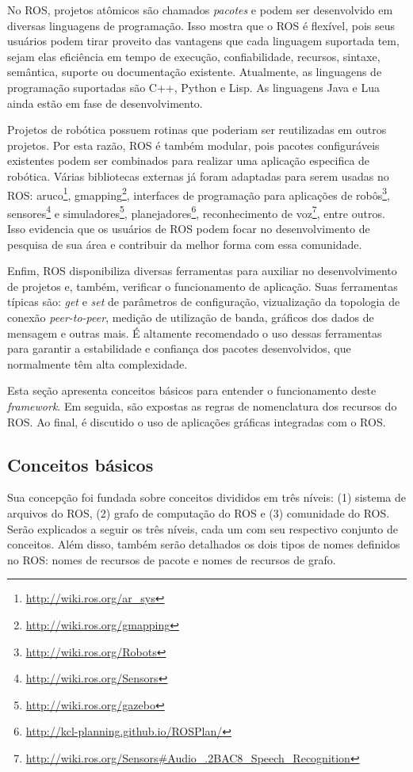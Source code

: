         No ROS, projetos atômicos são chamados \textit{pacotes} e podem ser desenvolvido em diversas linguagens de programação. Isso mostra que o ROS é flexível, pois seus usuários podem tirar proveito das vantagens que cada linguagem suportada tem, sejam elas eficiência em tempo de execução, confiabilidade, recursos, sintaxe, semântica, suporte ou documentação existente. Atualmente, as linguagens de programação suportadas são C++, Python e Lisp. As linguagens Java e Lua ainda estão em fase de desenvolvimento.
        
        Projetos de robótica possuem rotinas que poderiam ser reutilizadas em outros projetos. Por esta razão, ROS é também modular, pois pacotes configuráveis existentes podem ser combinados para realizar uma aplicação especifica de robótica. Várias bibliotecas externas já foram adaptadas para serem usadas no ROS: aruco\footnote{\url{http://wiki.ros.org/ar_sys}}, gmapping\footnote{\url{http://wiki.ros.org/gmapping}}, interfaces de programação para aplicações de robôs\footnote{\url{http://wiki.ros.org/Robots}}, sensores\footnote{\url{http://wiki.ros.org/Sensors}} e simuladores\footnote{\url{http://wiki.ros.org/gazebo}}, planejadores\footnote{\url{http://kcl-planning.github.io/ROSPlan/}}, reconhecimento de voz\footnote{\url{http://wiki.ros.org/Sensors\#Audio_.2BAC8_Speech_Recognition}}, entre outros. Isso evidencia que os usuários de ROS podem focar no desenvolvimento de pesquisa de sua área e contribuir da melhor forma com essa comunidade.
        
        Enfim, ROS disponibiliza diversas ferramentas para auxiliar no desenvolvimento de projetos e, também, verificar o funcionamento de aplicação. Suas ferramentas típicas são: \textit{get} e \textit{set} de parâmetros de configuração, vizualização da topologia de conexão \textit{peer-to-peer}, medição de utilização de banda, gráficos dos dados de mensagem e outras mais. É altamente recomendado o uso dessas ferramentas para garantir a estabilidade e confiança dos pacotes desenvolvidos, que normalmente têm alta complexidade.
        
        Esta seção apresenta conceitos básicos para entender o funcionamento deste \textit{framework}. Em seguida, são expostas as regras de nomenclatura dos recursos do ROS. Ao final, é discutido o uso de aplicações gráficas integradas com o ROS.
        
        \subsection{Conceitos básicos} \label{subsec:ros_conceitos}
            Sua concepção foi fundada sobre conceitos divididos em três níveis: (1) sistema de arquivos do ROS, (2) grafo de computação do ROS e (3) comunidade do ROS. Serão explicados a seguir os três níveis, cada um com seu respectivo conjunto de conceitos. Além disso, também serão detalhados os dois tipos de nomes definidos no ROS: nomes de recursos de pacote e nomes de recursos de grafo.
            
